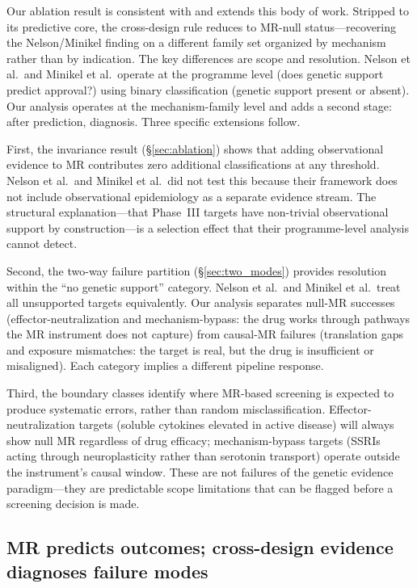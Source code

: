 \documentclass[11pt]{article}
\begin{document}
Our ablation result is consistent with and extends this body of work. Stripped to its predictive core, the cross-design rule reduces to MR-null status---recovering the Nelson/Minikel finding on a different family set organized by mechanism rather than by indication. The key differences are scope and resolution. Nelson et al.\ and Minikel et al.\ operate at the programme level (does genetic support predict approval?) using binary classification (genetic support present or absent). Our analysis operates at the mechanism-family level and adds a second stage: after prediction, diagnosis. Three specific extensions follow.

First, the invariance result (\S\ref{sec:ablation}) shows that adding observational evidence to MR contributes zero additional classifications at any threshold. Nelson et al.\ and Minikel et al.\ did not test this because their framework does not include observational epidemiology as a separate evidence stream. The structural explanation---that Phase~III targets have non-trivial observational support by construction---is a selection effect that their programme-level analysis cannot detect.

Second, the two-way failure partition (\S\ref{sec:two_modes}) provides resolution within the ``no genetic support'' category. Nelson et al.\ and Minikel et al.\ treat all unsupported targets equivalently. Our analysis separates null-MR successes (effector-neutralization and mechanism-bypass: the drug works through pathways the MR instrument does not capture) from causal-MR failures (translation gaps and exposure mismatches: the target is real, but the drug is insufficient or misaligned). Each category implies a different pipeline response.

Third, the boundary classes identify where MR-based screening is expected to produce systematic errors, rather than random misclassification. Effector-neutralization targets (soluble cytokines elevated in active disease) will always show null MR regardless of drug efficacy; mechanism-bypass targets (SSRIs acting through neuroplasticity rather than serotonin transport) operate outside the instrument's causal window. These are not failures of the genetic evidence paradigm---they are predictable scope limitations that can be flagged before a screening decision is made.

\subsection{MR predicts outcomes; cross-design evidence diagnoses failure modes}
\end{document}

